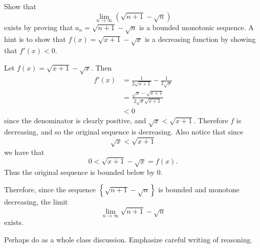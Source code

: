 \documentclass[]{ximera}
\begin{document}
\begin{problem}
Show that 
$$\lim_{n \to \infty} \left( \sqrt{n+1} - \sqrt{n} \right)$$ 
exists by proving that $a_n = \sqrt{n+1} - \sqrt{n}$ is a bounded monotonic sequence.  A hint is to show that $f(x) = \sqrt{x+1} - \sqrt{x}$ is a decreasing function by showing that $f'(x) < 0$.  
	\begin{freeResponse}
	Let $f(x) = \sqrt{x+1} - \sqrt{x}$.  Then
		\begin{align*}
		f'(x) 
		&= \frac{1}{2 \sqrt{x+1}} - \frac{1}{2 \sqrt{x}}  \\
		&= \frac{\sqrt{x} - \sqrt{x+1}}{2 \sqrt{x}\sqrt{x+1}}  \\
		&< 0
		\end{align*}
	since the denominator is clearly positive, and $\sqrt{x} < \sqrt{x+1}$.
	Therefore $f$ is decreasing, and so the original sequence is decreasing.  
	Also notice that since 
	$$\sqrt{x} < \sqrt{x+1}$$
	we have that 
	$$0 < \sqrt{x+1} - \sqrt{x} = f(x).$$
	Thus the original sequence is bounded below by $0$.  \

	Therefore, since the sequence $\left\{ \sqrt{n+1} - \sqrt{n} \right\}$ is bounded and monotone decreasing, the limit
		\[
		\lim_{n \to \infty} \sqrt{n+1} - \sqrt{n}
		\]
	exists.
	\end{freeResponse}
		
\end{problem}

\begin{instructorNotes}
Perhaps do as a whole class discussion.  
Emphasize careful writing of reasoning.
\end{instructorNotes}
\end{document}

